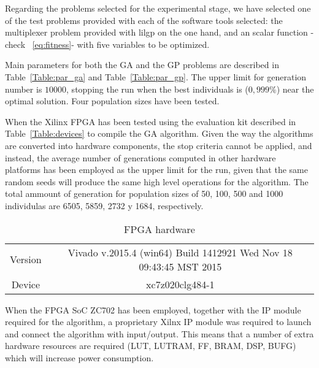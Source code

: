 Regarding the problems selected for the experimental stage, we have selected one of the test problems provided with each of the software tools selected:  the multiplexer problem provided with lilgp on the one hand, and an scalar function -check ~\ref{eq:fitness}-  with five variables to be optimized. 

Main parameters for both the GA and the GP problems are described in Table~\ref{Table:par_ga} and Table~\ref{Table:par_gp}.  The upper limit for generation number is  $10000$, stopping the run when the best individuals is ($0,999\%$) near the optimal solution. Four population sizes have been tested.

When the Xilinx FPGA has been tested using the evaluation kit described in Table~\ref{Table:devices} to compile the GA algorithm. Given the way the algorithms are converted into hardware components, the stop criteria cannot be applied, and instead, the average number of generations computed in other hardware platforms has been employed as the upper limit for the run, given that the same random seeds will produce the same high level operations for the algorithm.  The total ammount of generation for population sizes of 50, 100, 500 and 1000 individulas are  6505, 5859, 2732 y 1684, respectively.



\begin{table}
\renewcommand{\arraystretch}{1.3}
\centering
\caption{FPGA hardware}
\label{Table:fpga}
\begin{tabular}{cc} \hline
  Version & Vivado v.2015.4 (win64) Build 1412921 Wed Nov 18 09:43:45 MST 2015 \\ 
  Device & xc7z020clg484-1\\
\hline
\end{tabular}
\end{table}

When the FPGA SoC ZC702 has been employed, together with the IP module required for the algorithm, a proprietary Xilnx IP module was required to launch and connect the algorithm with input/output.  This means that a number of extra hardware resources are required (LUT, LUTRAM, FF, BRAM, DSP, BUFG) which will increase power consumption.  


